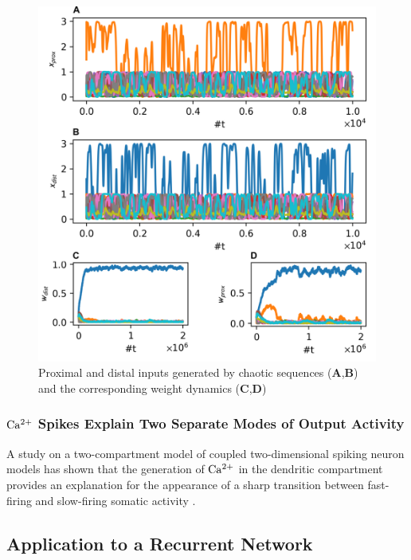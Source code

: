 \documentclass[10pt,a4paper]{article}
\begin{document}
\begin{figure}
\centering
\includegraphics[width=\textwidth]{./figures/dist_plast_comp.png}
\caption{Proximal and distal inputs generated by chaotic sequences ({\bf A},{\bf B}) and the corresponding weight dynamics ({\bf C},{\bf D})}
\label{fig:dist_plast_comp}
\end{figure}

\subsubsection{$\rm Ca^{2+}$ Spikes Explain Two Separate Modes of Output Activity}
A study on a two-compartment model of coupled two-dimensional spiking neuron models has shown that the generation of $\rm Ca^{2+}$ in the dendritic compartment provides an explanation for the appearance of a sharp transition between fast-firing and slow-firing somatic activity \cite{Yi_2017}.


\subsection{Application to a Recurrent Network}
\end{document}
